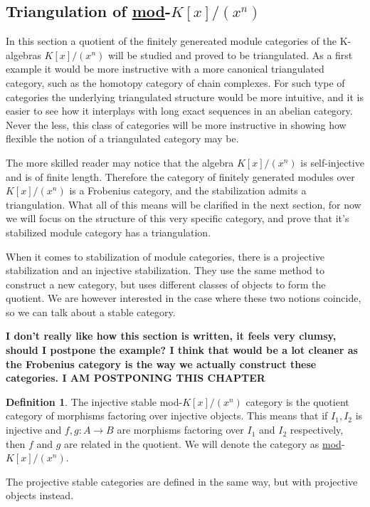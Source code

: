 \documentclass[12pt]{article}
\theoremstyle{definition}
\newtheorem{definition}{Definition}[section]
\theoremstyle{remark}
\begin{document}
        \subsection{Triangulation of \underline{mod}-$K[x]/(x^n)$}
            In this section a quotient of the finitely genereated module categories of the K-algebras $K[x]/(x^n)$ will be studied and proved to be triangulated. As a first example it would be more instructive with a more canonical triangulated category, such as the homotopy category of chain complexes. For such type of categories the underlying triangulated structure would be more intuitive, and it is easier to see how it interplays with long exact sequences in an abelian category. Never the less, this class of categories will be more instructive in showing how flexible the notion of a triangulated category may be.

            The more skilled reader may notice that the algebra $K[x]/(x^n)$ is self-injective and is of finite length. Therefore the category of finitely generated modules over $K[x]/(x^n)$ is a Frobenius category, and the stabilization admits a triangulation. What all of this means will be clarified in the next section, for now we will focus on the structure of this very specific category, and prove that it's stabilized module category has a triangulation.

            When it comes to stabilization of module categories, there is a projective stabilization and an injective stabilization. They use the same method to construct a new category, but uses different classes of objects to form the quotient. We are however interested in the case where these two notions coincide, so we can talk about a stable category.

            \textbf{I don't really like how this section is written, it feels very clumsy, should I postpone the example? I think that would be a lot cleaner as the Frobenius category is the way we actually construct these categories. I AM POSTPONING THIS CHAPTER}

            \begin{definition}
                The injective stable mod-$K[x]/(x^n)$ category is the quotient category of morphisms factoring over injective objects. This means that if $I_1, I_2$ is injective and $f,g:A\rightarrow B$ are morphisms factoring over $I_1$ and $I_2$ respectively, then $f$ and $g$ are related in the quotient. We will denote the category as \underline{mod}-$K[x]/(x^n)$.

                The projective stable categories are defined in the same way, but with projective objects instead.
            \end{definition}
\end{document}
